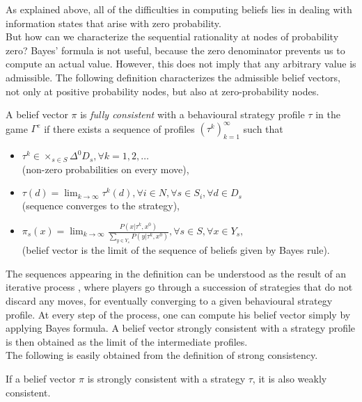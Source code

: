 As explained above,  all of the difficulties in computing beliefs lies in dealing with information states that arise with zero probability. \\
But how can we characterize the sequential rationality at nodes of  probability zero?  Bayes' formula is not useful, because the zero denominator prevents us to compute an actual value.  However, this does not imply that any arbitrary value is admissible.  The following definition characterizes the admissible belief vectors, not only at positive probability nodes, but also at zero-probability nodes.
\begin{definition}
A belief vector $\pi$ is \emph{fully consistent} with a behavioural strategy profile $\tau$ in the game $\Gamma^e$ if there exists a sequence of profiles $(\tau^k)_{k = 1}^\infty$ such that
\begin{itemize}
\item $\tau^k \in \times_{s \in S} \Delta^0 D_s, \forall k = 1,2,\ldots$ \\ (non-zero probabilities on every move),
\item  $\tau(d) = \lim_{k \rightarrow \infty} \tau^k(d),  \forall i \in N, \forall s \in S_i, \forall d \in D_s $\\
 (sequence converges to the strategy),
\item $ \pi_s(x) = \lim_{k \rightarrow \infty} \frac{P(x | \tau^k, x^0)}{\sum_{y \in Y_s}P(y| \tau^k, x^0)}, \forall s \in S, \forall x \in Y_s, $\\
(belief vector is the limit of the sequence of beliefs given by Bayes rule).
\end{itemize}
\label{ch4:def:StrongCons}
\end{definition}

The sequences appearing in the definition can be understood as the result of an iterative process , where players go through a succession of strategies that do not discard any moves, for eventually converging to a given behavioural strategy profile. At every step of the process, one can compute his belief vector simply by applying Bayes formula. A belief vector strongly consistent with a strategy profile is then obtained as the limit of the intermediate profiles. \\

The following is easily obtained from the definition of strong consistency.
\begin{proposition}
If a belief vector $\pi$ is strongly consistent with  a strategy $\tau$, it is also weakly consistent.
\end{proposition}

